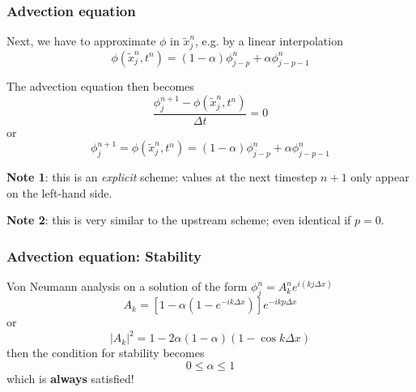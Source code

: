 \documentclass[aspectratio=43,9pt]{beamer}
\begin{document}
\begin{frame}
	\frametitle{Advection equation}
	\begin{myitemize}{2ex}
		\item Next, we have to approximate $\phi$ in $\tilde x_j^n$, e.g. by a linear interpolation
			\begin{equation*}
				\phi ( \tilde x_j^n, t^n) = (1-\alpha) \phi^n_{j-p} + \alpha \phi_{j-p-1}^n
			\end{equation*}
		\item The advection equation then becomes
			\begin{equation*}
				\frac{\phi^{n+1}_j-\phi(\tilde x_j^n,t^n)}{\Delta t} = 0
			\end{equation*}
			or
			\begin{equation*}
				\phi^{n+1}_j = \phi(\tilde x_j^n,t^n) = (1-\alpha) \phi^n_{j-p} + \alpha \phi_{j-p-1}^n
			\end{equation*}
	\pause
		\item \textbf{Note 1}: this is an \emph{explicit} scheme: values at the next timestep $n+1$ only appear on the left-hand side.
		\item \textbf{Note 2}: this is very similar to the upstream scheme; even identical if $p=0$.
	\end{myitemize}
\end{frame}
%
%
\begin{frame}
	\frametitle{Advection equation: Stability}
	\begin{myitemize}{2ex}
		\item Von Neumann analysis on a solution of the form $\phi_j^n = A_k^n e^{i(kj \Delta x)}$
			\begin{equation*}
				A_k = \left[ 1 - \alpha \left( 1 - e^{-i k \Delta x} \right) \right] e^{-i k p \Delta x}
			\end{equation*}
			or
			\begin{equation*}
				| A_k |^2 = 1 - 2 \alpha (1-\alpha) ( 1 -\cos k \Delta x )
			\end{equation*}
			then the condition for stability becomes
			\begin{equation*}
				0 \le \alpha \le 1
			\end{equation*}
			which is \textbf{always} satisfied!
	\end{myitemize}
\end{frame}
%
\end{document}
